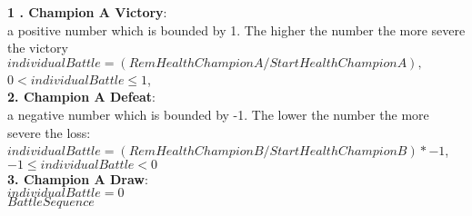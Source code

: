 \documentclass{article}
\begin{document}
\newpage
{\bf{1 . Champion A Victory}}: \\ a positive number which is bounded by 1.  The higher the number the more severe the victory\\
$individualBattle = (Rem Health  Champion A/ Start Health Champion A),$ \\$0< individualBattle \leq 1$,    \\
{\bf{2.  Champion A Defeat}}:\\ a negative number which is bounded by -1.  The lower the number the more severe the loss:\\
$individualBattle = (Rem Health Champion B/ Start Health Champion B) * -1$,\\ $-1 \leq individualBattle < 0$\\
{\bf{3.  Champion A Draw}}: \\
$individualBattle = 0 $\\

$Battle Sequence$




\newpage
\end{document}
